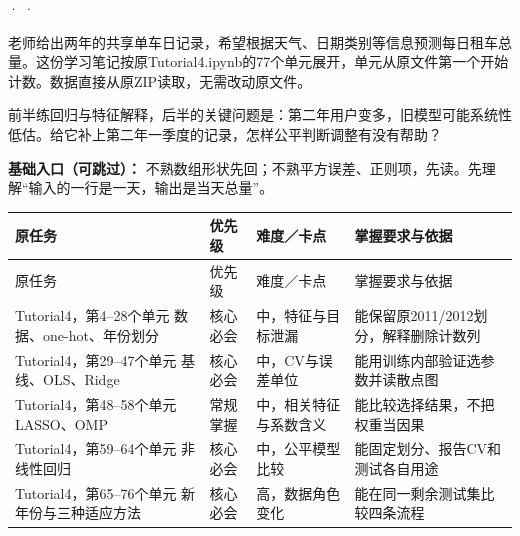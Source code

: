 






 ·  · 


老师给出两年的共享单车日记录，希望根据天气、日期类别等信息预测每日租车总量。这份学习笔记按原Tutorial4.ipynb的77个单元展开，单元从原文件第一个开始计数。数据直接从原ZIP读取，无需改动原文件。


前半练回归与特征解释，后半的关键问题是：第二年用户变多，旧模型可能系统性低估。给它补上第二年一季度的记录，怎样公平判断调整有没有帮助？


\textbf{基础入口（可跳过）：} 不熟数组形状先回；不熟平方误差、正则项，先读。先理解“输入的一行是一天，输出是当天总量”。


\begingroup
\small\setlength{\tabcolsep}{3pt}
\renewcommand{\arraystretch}{1.22}
\begin{longtable}{@{}>{\raggedright\arraybackslash}p{}>{\raggedright\arraybackslash}p{}>{\raggedright\arraybackslash}p{}>{\raggedright\arraybackslash}p{}@{}}
\toprule
原任务 & 优先级 & 难度／卡点 & 掌握要求与依据 \\
\midrule\endfirsthead
原任务 & 优先级 & 难度／卡点 & 掌握要求与依据 \\
\midrule\endhead
\bottomrule\endfoot
Tutorial4，第4–28个单元 数据、one-hot、年份划分 & 核心必会 & 中，特征与目标泄漏 & 能保留原2011/2012划分，解释删除计数列 \\
Tutorial4，第29–47个单元 基线、OLS、Ridge & 核心必会 & 中，CV与误差单位 & 能用训练内部验证选参数并读散点图 \\
Tutorial4，第48–58个单元 LASSO、OMP & 常规掌握 & 中，相关特征与系数含义 & 能比较选择结果，不把权重当因果 \\
Tutorial4，第59–64个单元 非线性回归 & 核心必会 & 中，公平模型比较 & 能固定划分、报告CV和测试各自用途 \\
Tutorial4，第65–76个单元 新年份与三种适应方法 & 核心必会 & 高，数据角色变化 & 能在同一剩余测试集比较四条流程 \\
\end{longtable}
\endgroup


